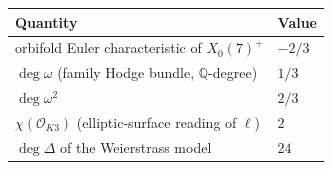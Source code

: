 \begin{tabular}{ll}
\toprule
Quantity & Value \\
\midrule
orbifold Euler characteristic of $X_0(7)^+$ & $-2/3$ \\
$\deg\omega$ (family Hodge bundle, $\mathbb{Q}$-degree) & $1/3$ \\
$\deg\omega^{2}$ & $2/3$ \\
$\chi(\mathcal{O}_{K3})$ (elliptic-surface reading of $\ell$) & $2$ \\
$\deg\Delta$ of the Weierstrass model & $24$ \\
\bottomrule
\end{tabular}
